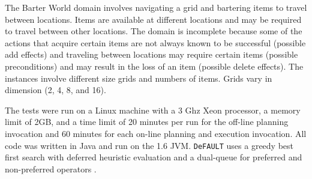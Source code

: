 \documentclass{article}
\def\citep#1{\cite{#1}}
\def\und#1{\noindent{\bf #1}:}
\def\FFRISKY{{\tt DeFAULT}}
\def\und#1{\medskip{\noindent\bf #1:}}
\begin{document}
The Barter World domain involves navigating a grid and bartering items to travel between locations.  Items are available at different locations and may be required to travel between other locations.  The domain is incomplete because some of the actions that acquire certain items are not always known to be successful (possible add effects) and traveling between locations may require certain items (possible preconditions) and may result in the loss of an item (possible delete effects).  The instances involve different size grids and numbers of items. Grids vary in dimension (2, 4, 8, and 16).


%
%
%
%
%


\und{Test Setup} The tests were run on a Linux machine with a 3 Ghz Xeon processor, a memory limit of 2GB, and a time limit of 20 minutes per run for the off-line planning invocation and 60 minutes for each on-line planning and execution invocation.  All code was written in Java and run on the 1.6 JVM.  \FFRISKY{} uses a greedy best first search with deferred heuristic evaluation and a dual-queue for preferred and non-preferred operators \citep{DBLP:journals/jair/Helmert06}.  %
\end{document}
